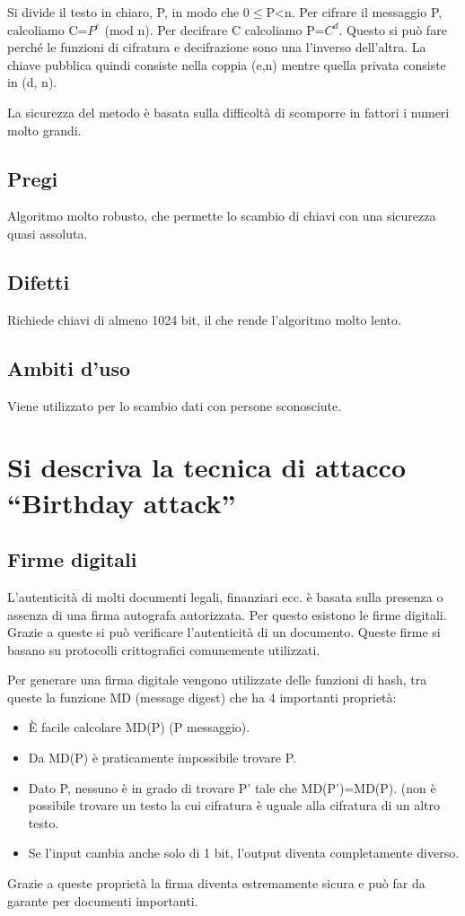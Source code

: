 Si divide il testo in chiaro, P, in modo che 0$\leq$P<n. Per cifrare il messaggio P, calcoliamo C=$P^e$ (mod n). Per decifrare C calcoliamo P=$C^d$. Questo si può fare perché le funzioni di cifratura e decifrazione sono una l'inverso dell'altra.
La chiave pubblica quindi consiste nella coppia (e,n) mentre quella privata consiste in (d, n).

La sicurezza del metodo è basata sulla difficoltà di scomporre in fattori i numeri molto grandi.

\subsection{Pregi}
Algoritmo molto robusto, che permette lo scambio di chiavi con una sicurezza quasi assoluta.
\subsection{Difetti}
Richiede chiavi di almeno 1024 bit, il che rende l'algoritmo molto lento.
\subsection{Ambiti d'uso}
Viene utilizzato per lo scambio dati con persone sconosciute.

\section{Si descriva la tecnica di attacco “Birthday attack”}
\subsection{Firme digitali}
L'autenticità di molti documenti legali, finanziari ecc. è basata sulla presenza o assenza di una firma autografa autorizzata. Per questo esistono le firme digitali. Grazie a queste si può verificare l'autenticità di un documento. Queste firme si basano su protocolli crittografici comunemente utilizzati.

Per generare una firma digitale vengono utilizzate delle funzioni di hash, tra queste la funzione MD (message digest) che ha 4 importanti proprietà:
\begin{itemize}
\item	È facile calcolare MD(P) (P messaggio).
\item	Da MD(P) è praticamente impossibile trovare P.
\item	Dato P, nessuno è in grado di trovare P' tale che MD(P')=MD(P). (non è possibile trovare un testo la cui cifratura è uguale alla cifratura di un altro testo.
\item	Se l'input cambia anche solo di 1 bit, l'output diventa completamente diverso.
\end{itemize}
Grazie a queste proprietà la firma diventa estremamente sicura e può far da garante per documenti importanti.
